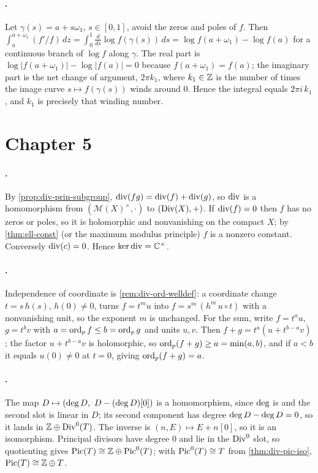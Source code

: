 \paragraph{.}
Let \(\gamma(s) = a + s\omega_1\), \(s \in [0,1]\), avoid the zeros and poles of
\(f\). Then \(\int_a^{a+\omega_1} (f'/f)\,dz = \int_0^1 \frac{d}{ds}\log f(\gamma(s))\,ds
= \log f(a+\omega_1) - \log f(a)\) for a continuous branch of \(\log f\) along
\(\gamma\). The real part is \(\log|f(a+\omega_1)| - \log|f(a)| = 0\) because
\(f(a+\omega_1) = f(a)\); the imaginary part is the net change of argument,
\(2\pi k_1\), where \(k_1 \in \mathbb{Z}\) is the number of times the image curve
\(s \mapsto f(\gamma(s))\) winds around \(0\). Hence the integral equals
\(2\pi i\,k_1\), and \(k_1\) is precisely that winding number.

\section{Chapter 5}
\label{sec:soln-ch5}

\paragraph{.}
By \cref{prop:div-prin-subgroup}, \(\operatorname{div}(fg) = \operatorname{div}(f) + \operatorname{div}(g)\),
so \(\operatorname{div}\) is a homomorphism from \((\mathcal{M}(X)^\times, \cdot)\) to
\((\operatorname{Div}(X), +)\). If \(\operatorname{div}(f) = 0\) then \(f\) has no zeros or poles, so it
is holomorphic and nonvanishing on the compact \(X\); by \cref{thm:ell-const}
(or the maximum modulus principle) \(f\) is a nonzero constant. Conversely
\(\operatorname{div}(c) = 0\). Hence \(\ker\operatorname{div} = \mathbb{C}^\times\).

\paragraph{.}
Independence of coordinate is \cref{rem:div-ord-welldef}: a coordinate change
\(t = s\,h(s)\), \(h(0)\ne0\), turns \(f = t^m u\) into
\(f = s^m\,(h^m\, u\!\circ\! t)\) with a nonvanishing unit, so the exponent
\(m\) is unchanged. For the sum, write \(f = t^{a}u\), \(g = t^{b}v\) with
\(a = \operatorname{ord}_p f \le b = \operatorname{ord}_p g\) and units \(u, v\). Then
\(f + g = t^{a}(u + t^{b-a}v)\); the factor \(u + t^{b-a}v\) is holomorphic, so
\(\operatorname{ord}_p(f+g) \ge a = \min(a,b)\), and if \(a < b\) it equals \(u(0) \ne 0\) at
\(t=0\), giving \(\operatorname{ord}_p(f+g) = a\).

\paragraph{.}
The map \(D \mapsto (\operatorname{deg} D,\ D - (\operatorname{deg} D)[0])\) is a homomorphism, since
\(\operatorname{deg}\) is and the second slot is linear in \(D\); its second component has
degree \(\operatorname{deg} D - \operatorname{deg} D = 0\), so it lands in \(\mathbb{Z} \oplus \operatorname{Div}^0(T)\). The
inverse is \((n, E) \mapsto E + n[0]\), so it is an isomorphism. Principal
divisors have degree \(0\) and lie in the \(\operatorname{Div}^0\) slot, so quotienting gives
\(\operatorname{Pic}(T) \cong \mathbb{Z} \oplus \operatorname{Pic}^0(T)\); with \(\operatorname{Pic}^0(T) \cong T\) from
\cref{thm:div-pic-iso}, \(\operatorname{Pic}(T) \cong \mathbb{Z} \oplus T\).


